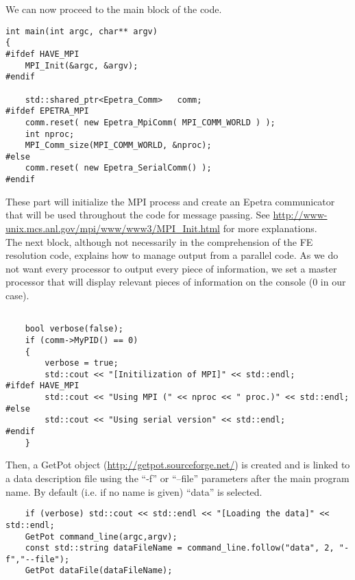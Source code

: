 We can now proceed to the main block of the code.

\begin{verbatim}
int main(int argc, char** argv)
{
#ifdef HAVE_MPI
    MPI_Init(&argc, &argv);
#endif

    std::shared_ptr<Epetra_Comm>   comm;
#ifdef EPETRA_MPI
    comm.reset( new Epetra_MpiComm( MPI_COMM_WORLD ) );
    int nproc;
    MPI_Comm_size(MPI_COMM_WORLD, &nproc);
#else
    comm.reset( new Epetra_SerialComm() );
#endif
\end{verbatim}

\noindent These part will initialize the MPI process and create an Epetra communicator
that will be used throughout the code for message passing. See
\url{http://www-unix.mcs.anl.gov/mpi/www/www3/MPI\_Init.html}
for more explanations.\\

The next block, although not necessarily in the comprehension of the FE resolution code, explains
how to manage output from a parallel code. As we do not want every processor to output
every piece of information, we set a master processor that will display relevant
pieces of information on the console ($0$ in our case).

\begin{verbatim}

    bool verbose(false);
    if (comm->MyPID() == 0)
    {
        verbose = true;
        std::cout << "[Initilization of MPI]" << std::endl;
#ifdef HAVE_MPI
        std::cout << "Using MPI (" << nproc << " proc.)" << std::endl;
#else
        std::cout << "Using serial version" << std::endl;
#endif
    }
\end{verbatim}

\noindent Then, a GetPot object (\url{http://getpot.sourceforge.net/}) is created
and is linked to a data description file using  the ``-f'' or ``--file'' parameters after
the main program name. By default (i.e. if no name is given) ``data'' is selected.

\begin{verbatim}
    if (verbose) std::cout << std::endl << "[Loading the data]" << std::endl;
    GetPot command_line(argc,argv);
    const std::string dataFileName = command_line.follow("data", 2, "-f","--file");
    GetPot dataFile(dataFileName);
\end{verbatim}

